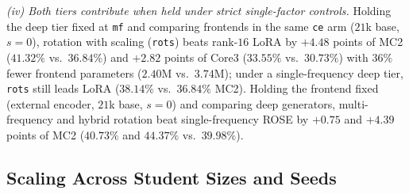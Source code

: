 \documentclass[10pt,twocolumn,letterpaper]{article}
\begin{document}
\emph{(iv) Both tiers contribute when held under strict single-factor controls.}
Holding the deep tier fixed at \texttt{mf} and comparing frontends in the same
\texttt{ce} arm ($21$k base, $s{=}0$), rotation with scaling (\texttt{rots})
beats rank-$16$ LoRA by $+4.48$ points of MC2 ($41.32\%$ vs.\ $36.84\%$) and
$+2.82$ points of Core3 ($33.55\%$ vs.\ $30.73\%$) with $36\%$ fewer frontend
parameters ($2.40$M vs.\ $3.74$M); under a single-frequency deep tier,
\texttt{rots} still leads LoRA ($38.14\%$ vs.\ $36.84\%$ MC2). Holding the
frontend fixed (external encoder, $21$k base, $s{=}0$) and comparing deep
generators, multi-frequency and hybrid rotation beat single-frequency ROSE by
$+0.75$ and $+4.39$ points of MC2 ($40.73\%$ and $44.37\%$ vs.\ $39.98\%$).

\subsection{Scaling Across Student Sizes and Seeds}
\label{sec:scaling}
\end{document}
